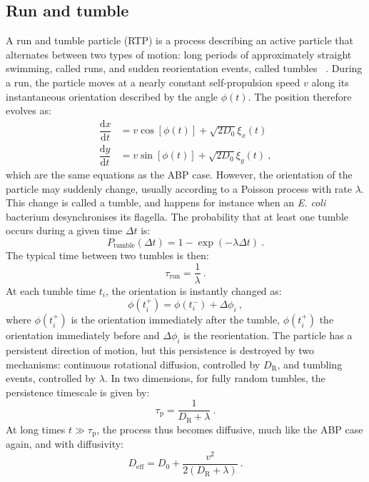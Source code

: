 \subsection{Run and tumble}

A run and tumble particle (RTP) is a process describing an active particle that alternates between two types of motion: long periods of approximately straight swimming, called runs, and sudden reorientation events, called tumbles ~\cite{berg1979movement,schnitzer1990strategies, berg2004ecoli,}. During a run, the particle moves at a nearly constant self-propulsion speed $v$
along its instantaneous orientation described by the angle $\phi(t)$. The position therefore evolves as:
\begin{equation}
\begin{aligned}
    \dfrac{\mathrm{d}x}{\mathrm{d}t} &= v \cos[\phi(t)] + \sqrt{2D_0}\xi_x(t)\\
    \dfrac{\mathrm{d}y}{\mathrm{d}t} &= v\sin[\phi(t)] + \sqrt{2D_0}\xi_y(t)~,
\end{aligned}
\end{equation}
which are the same equations as the ABP case. However, the orientation of the particle may suddenly change, usually according to a Poisson process with rate $\lambda$. This change is called a tumble, and happens for instance when an \emph{E. coli} bacterium desynchronises its flagella. The probability that at least one tumble occurs during a given time $\Delta t$ is:
\begin{equation}
P_{\mathrm{tumble}}(\Delta t) = 1-\exp(-\lambda \Delta t)~.
\end{equation}
The typical time between two tumbles is then:
\begin{equation}
    \tau_{\mathrm{run}} = \dfrac{1}{\lambda}~.
    \label{poisson}
\end{equation}
At each tumble time $t_i$, the orientation is instantly changed as:
\begin{equation}
\phi(t_i^+) = \phi(t_i^-) + \Delta\phi_i~,
\end{equation}
where $\phi(t_i^+)$ is the orientation immediately after the tumble, $\phi(t_i^+)$ the orientation immediately before and $\Delta\phi_i$ is the reorientation. The particle has a persistent direction of motion, but this persistence is destroyed by two mechanisms: continuous rotational diffusion, controlled by $D_\mathrm{R}$, and tumbling events, controlled by $\lambda$. In two dimensions, for fully random tumbles, the persistence timescale is given by:
\begin{equation}
    \tau_\mathrm{p} = \dfrac{1}{D_\mathrm{R}+\lambda}~.
\end{equation}
At long times $t \gg \tau_\mathrm{p}$, the process thus becomes diffusive, much like the ABP case again, and with diffusivity:
\begin{equation}
    D_{\mathrm{eff}}=D_0 + \dfrac{v^2}{2(D_\mathrm{R}+\lambda)}~.
\end{equation}

